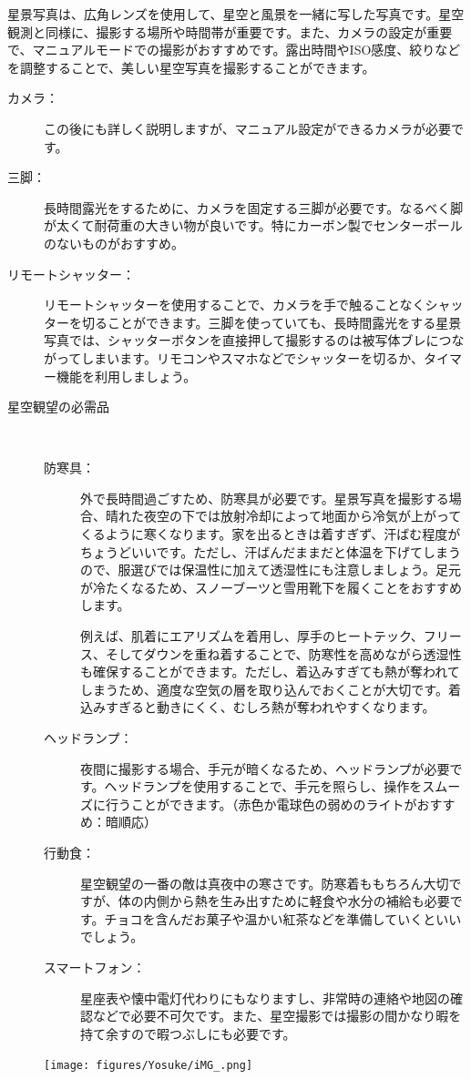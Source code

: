 \documentclass[supernova_2023]{subfiles}
\begin{document}
星景写真は、広角レンズを使用して、星空と風景を一緒に写した写真です。星空観測と同様に、撮影する場所や時間帯が重要です。また、カメラの設定が重要で、マニュアルモードでの撮影がおすすめです。露出時間やISO感度、絞りなどを調整することで、美しい星空写真を撮影することができます。

\begin{tcolorbox}[title=星景写真に必要な物, breakable]
  \begin{description}
    \item[カメラ：]この後にも詳しく説明しますが、マニュアル設定ができるカメラが必要です。
    \item[三脚：]長時間露光をするために、カメラを固定する三脚が必要です。なるべく脚が太くて耐荷重の大きい物が良いです。特にカーボン製でセンターポールのないものがおすすめ。
    \item[リモートシャッター：]リモートシャッターを使用することで、カメラを手で触ることなくシャッターを切ることができます。三脚を使っていても、長時間露光をする星景写真では、シャッターボタンを直接押して撮影するのは被写体ブレにつながってしまいます。リモコンやスマホなどでシャッターを切るか、タイマー機能を利用しましょう。
    \item[星空観望の必需品] \mbox{}\\
    \begin{description}
      \item[防寒具：] 外で長時間過ごすため、防寒具が必要です。星景写真を撮影する場合、晴れた夜空の下では放射冷却によって地面から冷気が上がってくるように寒くなります。家を出るときは着すぎず、汗ばむ程度がちょうどいいです。ただし、汗ばんだままだと体温を下げてしまうので、服選びでは保温性に加えて透湿性にも注意しましょう。足元が冷たくなるため、スノーブーツと雪用靴下を履くことをおすすめします。\mbox{}\par
      例えば、肌着にエアリズムを着用し、厚手のヒートテック、フリース、そしてダウンを重ね着することで、防寒性を高めながら透湿性も確保することができます。ただし、着込みすぎても熱が奪われてしまうため、適度な空気の層を取り込んでおくことが大切です。着込みすぎると動きにくく、むしろ熱が奪われやすくなります。
      \item[ヘッドランプ：] 夜間に撮影する場合、手元が暗くなるため、ヘッドランプが必要です。ヘッドランプを使用することで、手元を照らし、操作をスムーズに行うことができます。（赤色か電球色の弱めのライトがおすすめ：暗順応）
      \item[行動食：] 星空観望の一番の敵は真夜中の寒さです。防寒着ももちろん大切ですが、体の内側から熱を生み出すために軽食や水分の補給も必要です。チョコを含んだお菓子や温かい紅茶などを準備していくといいでしょう。
      \item[スマートフォン：] 星座表や懐中電灯代わりにもなりますし、非常時の連絡や地図の確認などで必要不可欠です。また、星空撮影では撮影の間かなり暇を持て余すので暇つぶしにも必要です。
    \end{description}
      \centering
      \texttt{[image: figures/Yosuke/iMG\_.png]}
  \end{description}
\end{tcolorbox}
\end{document}
